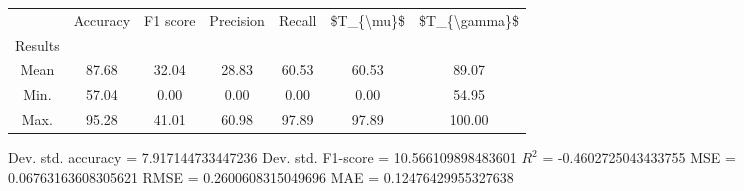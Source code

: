 \begin{tabular}{|c|c|c|c|c|c|c|}
\toprule
{} &  Accuracy &  F1 score &  Precision &  Recall &  \$T\_\{\textbackslash mu\}\$ &  \$T\_\{\textbackslash gamma\}\$ \\
Results &           &           &            &         &            &               \\
\hline
Mean    &     87.68 &     32.04 &      28.83 &   60.53 &      60.53 &         89.07 \\
Min.    &     57.04 &      0.00 &       0.00 &    0.00 &       0.00 &         54.95 \\
Max.    &     95.28 &     41.01 &      60.98 &   97.89 &      97.89 &        100.00 \\
\bottomrule
\end{tabular}

 Dev. std. accuracy = 7.917144733447236
 Dev. std. F1-score = 10.566109898483601
 $R^2$ = -0.4602725043433755
 MSE = 0.06763163608305621
 RMSE = 0.2600608315049696
 MAE = 0.12476429955327638